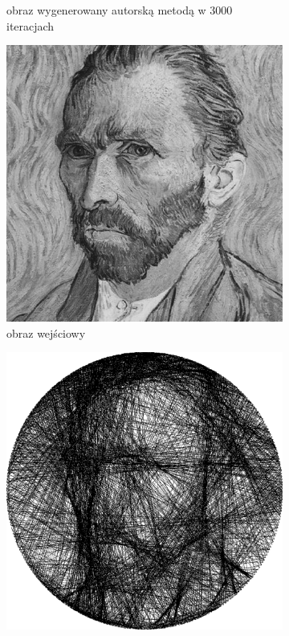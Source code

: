 \documentclass[a4paper, 12pt, polish, twoside]{extreport}
\begin{document}
\begin{figure}[H]
\begin{subfigure}{0.24\textwidth}
        \caption{obraz wygenerowany autorską metodą w 3000 iteracjach}
        \label{comp-comp-dufu-gogh-d}
    \end{subfigure}
    \begin{subfigure}{0.24\textwidth}
        \centering
        \includegraphics[width = \textwidth]{img/6-comp/gogh_original_c10_inv0.png}
        \caption{obraz wejściowy}
        \label{comp-comp-dufu-gogh-e}
    \end{subfigure}
    \begin{subfigure}{0.24\textwidth}
        \centering
        \includegraphics[width = \textwidth]{img/6-comp/gogh_xiaonan_.png}

\end{subfigure}
\end{figure}
\end{document}

